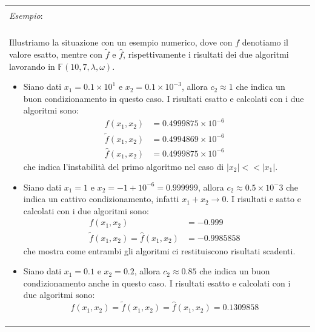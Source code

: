 \documentclass{article}
\numberwithin{equation}{section}
\newenvironment{example}
{\begin{center}
        \begin{tabular}{|p{0.9\textwidth}|}
            \hline \\ 
            \textit{Esempio}: \\\\ 
        }
        {
            \\\\ \hline
        \end{tabular}
    \end{center}
}
\begin{document}
\begin{example}
    Illustriamo la situazione con un esempio numerico, dove con $f$ denotiamo
    il valore esatto, mentre con $\tilde{f}$ e $\hat{f}$, rispettivamente i
    risultati dei due algoritmi lavorando in
    $\mathbb{F}(10,7,\lambda,\omega)$.
    \begin{itemize}
        \item Siano dati $x_1=0.1\times10^1$ e $x_2=0.1\times10^{-3}$, allora
            $c_2\approx1$ che indica un buon condizionamento in questo caso. I
            risultati esatto e calcolati con i due algoritmi sono:
            \begin{equation*}
               \begin{aligned}
                   f(x_1,x_2)&=0.4999875\times10^{-6}\\
                   \tilde{f}(x_1,x_2)&=0.4994869\times10^{-6}\\
                   \hat{f}(x_1,x_2)&=0.4999875\times10^{-6}
               \end{aligned} 
            \end{equation*}
            che indica l'instabilità del primo algoritmo nel caso di
            $\left\lvert x_2\right\rvert<<\left\lvert x_1\right\rvert$.
        \item Siano dati $x_1=1$ e $x_2=-1+10^{-6}=0.999999$, allora
            $c_2\approx0.5\times10^-3$ che indica un cattivo condizionamento,
            infatti $x_1+x_2\rightarrow 0$. I risultati e satto e calcolati
            con i due algoritmi sono:
            \begin{equation*}
               \begin{aligned}
                   f(x_1,x_2)&=-0.999\\
                   \tilde{f}(x_1,x_2)=\hat{f}(x_1,x_2)&=-0.9985858
               \end{aligned} 
            \end{equation*}
            che mostra come entrambi gli algoritmi ci restituiscono risultati
            scadenti.
        \item Siano dati $x_1=0.1$ e $x_2=0.2$, allora $c_2\approx0.85$ che
            indica un buon condizionamento anche in questo caso. I risultati esatto
            e calcolati con i due algoritmi sono:
            $$f(x_1,x_2)=\tilde{f}(x_1,x_2)=\hat{f}(x_1,x_2)=0.1309858$$
    \end{itemize}
\end{example}
\newpage
\end{document}

